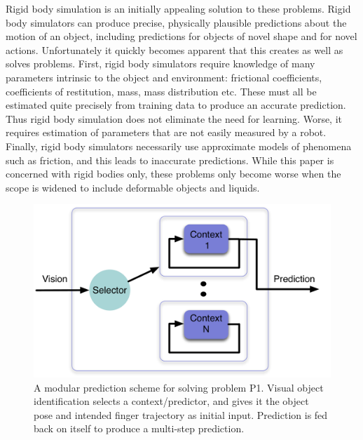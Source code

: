 Rigid body simulation is an initially appealing solution to these problems. Rigid body simulators can produce precise, physically plausible predictions about the motion of an object, including predictions for objects of novel shape and for novel actions. Unfortunately it quickly becomes apparent that this creates as well as solves problems. First, rigid body simulators require knowledge of many parameters intrinsic to the object and environment: frictional coefficients, coefficients of restitution, mass, mass distribution etc. These must all be estimated quite precisely from training data to produce an accurate prediction. Thus rigid body simulation does not eliminate the need for learning. Worse, it requires estimation of parameters that are not easily measured by a robot. Finally, rigid body simulators necessarily use approximate models of phenomena such as friction, and this leads to inaccurate predictions. While this paper is concerned with rigid bodies only, these problems only become worse when the scope is widened to include deformable objects and liquids.
\begin{figure}[t]
\centerline{\includegraphics[width=0.9\columnwidth]{modular-schema}}
\caption{A modular prediction scheme for solving problem P1. Visual object identification selects a context/predictor, and gives it the object pose and intended finger trajectory as initial input. Prediction is fed back on itself to produce a multi-step prediction. \label{fig:modular-simple}}
\end{figure}
